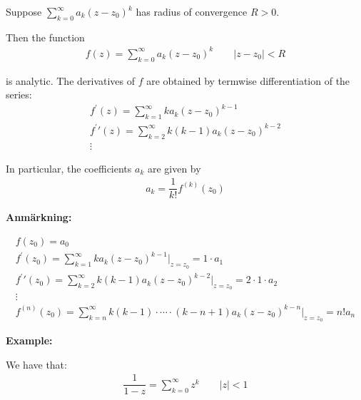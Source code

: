 \begin{theo}[]{}
  Suppose $\sum_{k=0}^{\infty}a_k(z-z_0)^k$ has radius of convergence $R>0$.\par
  \noindent Then the function
  \begin{equation*}
    \begin{gathered}
      f(z) = \sum_{k=0}^{\infty}a_k(z-z_0)^k\qquad\left|z-z_0\right|<R
    \end{gathered}
  \end{equation*}\par
  \noindent is analytic. The derivatives of $f$ are obtained by termwise differentiation of the series:
  \begin{equation*}
    \begin{gathered}
      f^{\prime}(z) = \sum_{k=1}^{\infty}ka_k(z-z_0)^{k-1}\\
      f^{\prime}\prime(z) = \sum_{k=2}^{\infty}k(k-1)a_k(z-z_0)^{k-2}\\
      \vdots
    \end{gathered}
  \end{equation*}
  \par\bigskip
  \noindent In particular, the coefficients $a_k$ are given by
  \begin{equation*}
    \begin{gathered}
      a_k = \dfrac{1}{k!}f^{(k)}(z_0)
    \end{gathered}
  \end{equation*}
\end{theo}
\par\bigskip
\noindent\textbf{Anmärkning:}\par
\begin{equation*}
  \begin{gathered}
    f(z_0) = a_0\\
    f^{\prime}(z_0) = \sum_{k=1}^{\infty}ka_k(z-z_0)^{k-1}\Big|_{z = z_0} = 1\cdot a_1\\
    f^{\prime}\prime(z_0) = \sum_{k=2}^{\infty}k(k-1)a_k(z-z_0)^{k-2}\Big|_{z = z_0} = 2\cdot1\cdot a_2\\
    \vdots\\
    f^{(n)}(z_0)  =\sum_{k=n}^{\infty}k(k-1)\cdot\cdots\cdot(k-n+1)a_k(z-z_0)^{k-n}\Big|_{z= z_0} = n!a_n
  \end{gathered}
\end{equation*}
\par\bigskip
\noindent\textbf{Example:}\par
\noindent We have that:
\begin{equation*}
  \begin{gathered}
    \dfrac{1}{1-z} = \sum_{k=0}^{\infty}z^k\qquad \left|z\right|<1
  \end{gathered}
\end{equation*}\par
